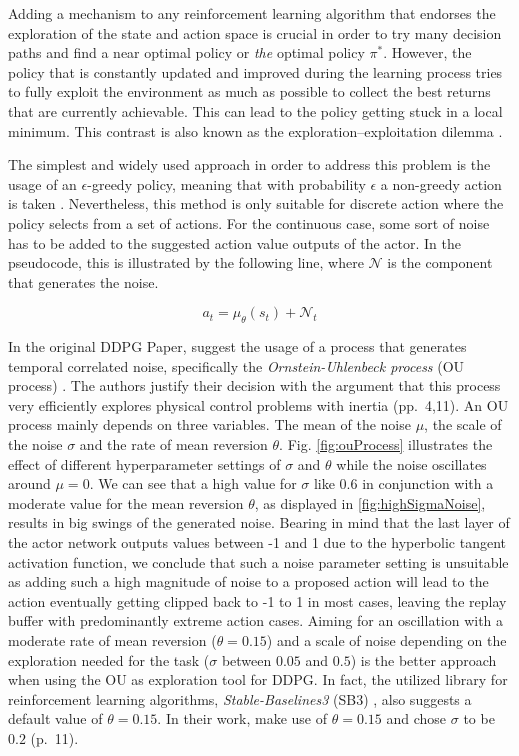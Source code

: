 Adding a mechanism to any reinforcement learning algorithm that endorses the exploration of the state and action space is crucial in order to try many decision paths and find a near optimal policy or \textit{the} optimal policy $\pi^*$. However, the policy that is constantly updated and improved during the learning process tries to fully exploit the environment as much as possible to collect the best returns that are currently achievable. This can lead to the policy getting stuck in a local minimum. This contrast is also known as the exploration–exploitation dilemma \cite[p.~3]{Sutton1998}.
\par
The simplest and widely used approach in order to address this problem is the usage of an $\epsilon$-greedy policy, meaning that with probability $\epsilon$ a non-greedy action is taken \cite[p.~100]{Sutton1998}. Nevertheless, this method is only suitable for discrete action where the policy selects from a set of actions. For the continuous case, some sort of noise has to be added to the suggested action value outputs of the actor. In the pseudocode, this is illustrated by the following line, where $\mathcal{N}$ is the component that generates the noise.
\par
\begin{equation*}
    a_t = \mu_\theta(s_t) + \mathcal{N}_t
\end{equation*}
\par 
In the original DDPG Paper, \cite{lillicrap2019continuous} suggest the usage of a process that generates temporal correlated noise, specifically the \textit{Ornstein-Uhlenbeck process} (OU process) \cite[]{uhlenbeck1930theory}. The authors justify their decision with the argument that this process very efficiently explores physical control problems with inertia (pp.~4,11). An OU process mainly depends on three variables. The mean of the noise $\mu$, the scale of the noise $\sigma$ and the rate of mean reversion $\theta$. Fig. \ref{fig:ouProcess} illustrates the effect of different hyperparameter settings of $\sigma$ and $\theta$ while the noise oscillates around $\mu=0$. We can see that a high value for $\sigma$ like $0.6$ in conjunction with a moderate value for the mean reversion $\theta$, as displayed in \ref{fig:highSigmaNoise}, results in big swings of the generated noise. Bearing in mind that the last layer of the actor network outputs values between -1 and 1 due to the hyperbolic tangent activation function, we conclude that such a noise parameter setting is unsuitable as adding such a high magnitude of noise to a proposed action will lead to the action eventually getting clipped back to -1 to 1 in most cases, leaving the replay buffer with predominantly extreme action cases. Aiming for an oscillation with a moderate rate of mean reversion ($\theta = 0.15$) and a scale of noise depending on the exploration needed for the task ($\sigma$ between $0.05$ and $0.5$) is the better approach when using the OU as exploration tool for DDPG. In fact, the utilized library for reinforcement learning algorithms, \textit{Stable-Baselines3} (SB3) \cite[]{stable-baselines3}, also suggests a default value of $\theta = 0.15$. In their work, \cite{lillicrap2019continuous} make use of $\theta = 0.15$ and chose $\sigma$ to be $0.2$ (p.~11).
